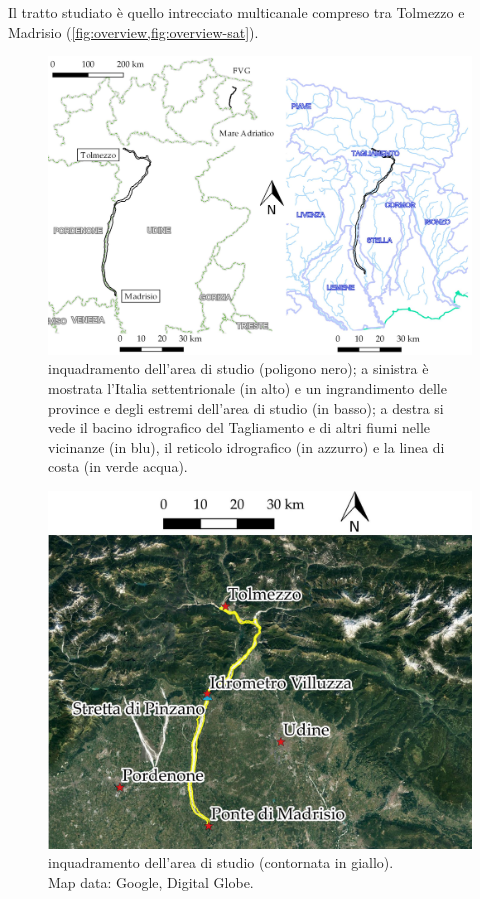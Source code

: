 Il tratto studiato è quello intrecciato multicanale compreso tra Tolmezzo e Madrisio (\vref{fig:overview,fig:overview-sat}). 

%
\begin{figure}
	\centering
	\includegraphics[width=\textwidth]{files/overview.jpeg}
	\caption[inquadramento dell'area di studio]
		{inquadramento dell'area di studio (poligono nero); a sinistra è mostrata l'Italia settentrionale (in alto) e un ingrandimento delle province e degli estremi dell'area di studio (in basso); a destra si vede il bacino idrografico del Tagliamento e di altri fiumi nelle vicinanze (in blu), il reticolo idrografico (in azzurro) e la linea di costa (in verde acqua).}
	\label{fig:overview}
\end{figure}
%
\begin{figure}
	\centering
	\includegraphics[width=\textwidth]{files/overview_tratto_sat.jpeg}
	\caption[inquadramento dell'area di studio]{inquadramento dell'area di studio (contornata in giallo).
	\\
	Map data: Google, Digital Globe.}
	\label{fig:overview-sat}
\end{figure}

